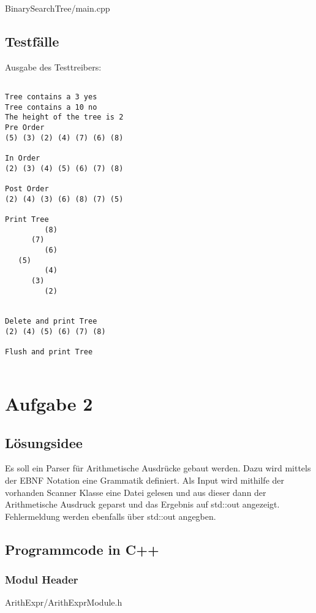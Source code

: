 \documentclass[10pt,a4paper]{scrartcl}
\begin{document}

{BinarySearchTree/main.cpp}

\newpage
\subsection{Testf\"{a}lle}

Ausgabe des Testtreibers:

\begin{lstlisting}

Tree contains a 3 yes
Tree contains a 10 no
The height of the tree is 2
Pre Order
(5) (3) (2) (4) (7) (6) (8)

In Order
(2) (3) (4) (5) (6) (7) (8)

Post Order
(2) (4) (3) (6) (8) (7) (5)

Print Tree
         (8)
      (7)
         (6)
   (5)
         (4)
      (3)
         (2)


Delete and print Tree
(2) (4) (5) (6) (7) (8)

Flush and print Tree


\end{lstlisting}

\section{Aufgabe 2}

\subsection{L\"{o}sungsidee}

Es soll ein Parser für Arithmetische Ausdrücke gebaut werden.
Dazu wird mittels der EBNF Notation eine Grammatik definiert.
Als Input wird mithilfe der vorhanden Scanner Klasse eine Datei gelesen und aus dieser dann der Arithmetische Ausdruck geparst
und das Ergebnis auf std::out angezeigt. Fehlermeldung werden ebenfalls über std::out angegben.

\newpage
\subsection{Programmcode in C++}

\subsubsection{Modul Header}


{ArithExpr/ArithExprModule.h}
\end{document}
